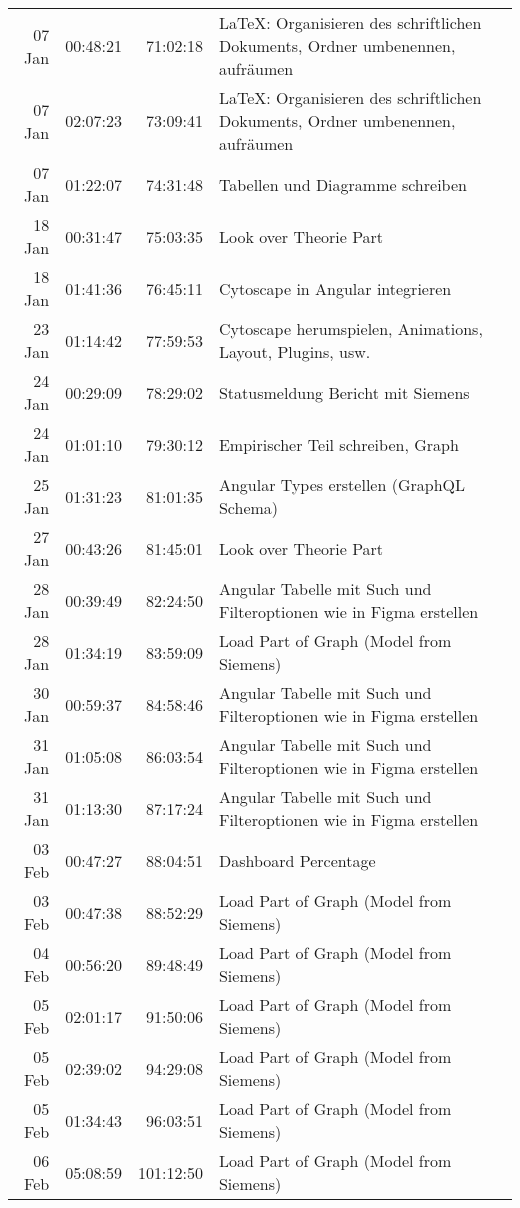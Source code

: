 \begin{longtable}{r | r | r | p{}}
	 07 Jan & 00:48:21 & 71:02:18 & LaTeX: Organisieren des schriftlichen Dokuments, Ordner umbenennen, aufräumen \\ 
	 07 Jan & 02:07:23 & 73:09:41 & LaTeX: Organisieren des schriftlichen Dokuments, Ordner umbenennen, aufräumen \\ 
	 07 Jan & 01:22:07 & 74:31:48 & Tabellen und Diagramme schreiben \\ 
	 18 Jan & 00:31:47 & 75:03:35 & Look over Theorie Part \\ 
	 18 Jan & 01:41:36 & 76:45:11 & Cytoscape in Angular integrieren \\ 
	 23 Jan & 01:14:42 & 77:59:53 & Cytoscape herumspielen, Animations, Layout, Plugins, usw. \\ 
	 24 Jan & 00:29:09 & 78:29:02 & Statusmeldung Bericht mit Siemens \\ 
	 24 Jan & 01:01:10 & 79:30:12 & Empirischer Teil schreiben, Graph \\ 
	 25 Jan & 01:31:23 & 81:01:35 & Angular Types erstellen (GraphQL Schema) \\ 
	 27 Jan & 00:43:26 & 81:45:01 & Look over Theorie Part \\ 
	 28 Jan & 00:39:49 & 82:24:50 & Angular Tabelle mit Such und Filteroptionen wie in Figma erstellen \\ 
	 28 Jan & 01:34:19 & 83:59:09 & Load Part of Graph (Model from Siemens) \\ 
	 30 Jan & 00:59:37 & 84:58:46 & Angular Tabelle mit Such und Filteroptionen wie in Figma erstellen \\ 
	 31 Jan & 01:05:08 & 86:03:54 & Angular Tabelle mit Such und Filteroptionen wie in Figma erstellen \\ 
	 31 Jan & 01:13:30 & 87:17:24 & Angular Tabelle mit Such und Filteroptionen wie in Figma erstellen \\ 
	 03 Feb & 00:47:27 & 88:04:51 & Dashboard Percentage \\ 
	 03 Feb & 00:47:38 & 88:52:29 & Load Part of Graph (Model from Siemens) \\ 
	 04 Feb & 00:56:20 & 89:48:49 & Load Part of Graph (Model from Siemens) \\ 
	 05 Feb & 02:01:17 & 91:50:06 & Load Part of Graph (Model from Siemens) \\ 
	 05 Feb & 02:39:02 & 94:29:08 & Load Part of Graph (Model from Siemens) \\ 
	 05 Feb & 01:34:43 & 96:03:51 & Load Part of Graph (Model from Siemens) \\ 
	 06 Feb & 05:08:59 & 101:12:50 & Load Part of Graph (Model from Siemens) \\ 

\end{longtable}
